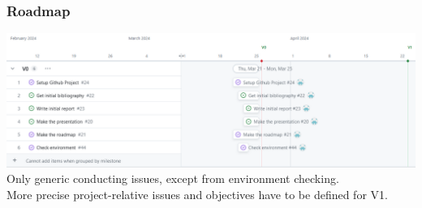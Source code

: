 \documentclass[10pt]{beamer}
\begin{document}
\begin{frame}
    \frametitle{\textbf{Roadmap}}
    \includegraphics[width=\textwidth]{../roadmap/roadmapv0-group.png}\\
    [1cm]
    Only generic conducting issues, except from environment checking.\\
    More precise project-relative issues and objectives have to be defined for V1.
\end{frame}
\end{document}

